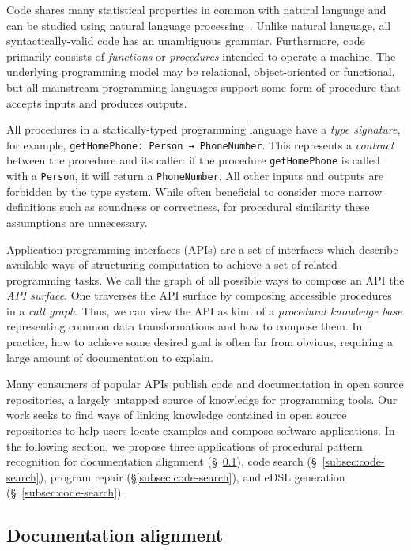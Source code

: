 \documentclass[11pt]{article}
\begin{document}
    Code shares many statistical properties in common with natural language and can be studied using natural language processing~\cite{hindle2012naturalness}. Unlike natural language, all syntactically-valid code has an unambiguous grammar. Furthermore, code primarily consists of \textit{functions} or \textit{procedures} intended to operate a machine. The underlying programming model may be relational, object-oriented or functional, but all mainstream programming languages support some form of procedure that accepts inputs and produces outputs.

    All procedures in a statically-typed programming language have a \textit{type signature}, for example, \texttt{getHomePhone: Person → PhoneNumber}. This represents a \textit{contract} between the procedure and its caller: if the procedure \texttt{getHomePhone} is called with a \texttt{Person}, it will return a \texttt{PhoneNumber}. All other inputs and outputs are forbidden by the type system. While often beneficial to consider more narrow definitions such as soundness or correctness, for procedural similarity these assumptions are unnecessary.

    Application programming interfaces (APIs) are a set of interfaces which describe available ways of structuring computation to achieve a set of related programming tasks. We call the graph of all possible ways to compose an API the \textit{API surface}. One traverses the API surface by composing accessible procedures in a \textit{call graph}. Thus, we can view the API as kind of a \textit{procedural knowledge base} representing common data transformations and how to compose them. In practice, how to achieve some desired goal is often far from obvious, requiring a large amount of documentation to explain.

    Many consumers of popular APIs publish code and documentation in open source repositories, a largely untapped source of knowledge for programming tools. Our work seeks to find ways of linking knowledge contained in open source repositories to help users locate examples and compose software applications. In the following section, we propose three applications of procedural pattern recognition for documentation alignment (\S~\ref{subsec:tracelink}), code search (\S~\ref{subsec:code-search}), program repair (\S\ref{subsec:code-search}), and eDSL generation (\S~\ref{subsec:code-search}).

    \subsection{Documentation alignment}\label{subsec:tracelink}
\end{document}
